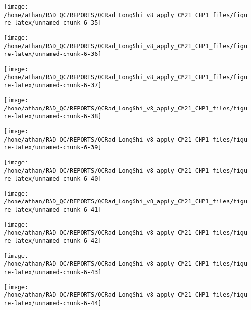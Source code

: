 \documentclass[
  10pt,
  a4paper,oneside]{article}
\begin{document}
\begin{center}\texttt{[image: /home/athan/RAD\_QC/REPORTS/QCRad\_LongShi\_v8\_apply\_CM21\_CHP1\_files/figure-latex/unnamed-chunk-6-35]} \end{center}

\begin{center}\texttt{[image: /home/athan/RAD\_QC/REPORTS/QCRad\_LongShi\_v8\_apply\_CM21\_CHP1\_files/figure-latex/unnamed-chunk-6-36]} \end{center}

\begin{center}\texttt{[image: /home/athan/RAD\_QC/REPORTS/QCRad\_LongShi\_v8\_apply\_CM21\_CHP1\_files/figure-latex/unnamed-chunk-6-37]} \end{center}

\begin{center}\texttt{[image: /home/athan/RAD\_QC/REPORTS/QCRad\_LongShi\_v8\_apply\_CM21\_CHP1\_files/figure-latex/unnamed-chunk-6-38]} \end{center}

\begin{center}\texttt{[image: /home/athan/RAD\_QC/REPORTS/QCRad\_LongShi\_v8\_apply\_CM21\_CHP1\_files/figure-latex/unnamed-chunk-6-39]} \end{center}

\begin{center}\texttt{[image: /home/athan/RAD\_QC/REPORTS/QCRad\_LongShi\_v8\_apply\_CM21\_CHP1\_files/figure-latex/unnamed-chunk-6-40]} \end{center}

\begin{center}\texttt{[image: /home/athan/RAD\_QC/REPORTS/QCRad\_LongShi\_v8\_apply\_CM21\_CHP1\_files/figure-latex/unnamed-chunk-6-41]} \end{center}

\begin{center}\texttt{[image: /home/athan/RAD\_QC/REPORTS/QCRad\_LongShi\_v8\_apply\_CM21\_CHP1\_files/figure-latex/unnamed-chunk-6-42]} \end{center}

\begin{center}\texttt{[image: /home/athan/RAD\_QC/REPORTS/QCRad\_LongShi\_v8\_apply\_CM21\_CHP1\_files/figure-latex/unnamed-chunk-6-43]} \end{center}

\begin{center}\texttt{[image: /home/athan/RAD\_QC/REPORTS/QCRad\_LongShi\_v8\_apply\_CM21\_CHP1\_files/figure-latex/unnamed-chunk-6-44]} \end{center}
\end{document}
